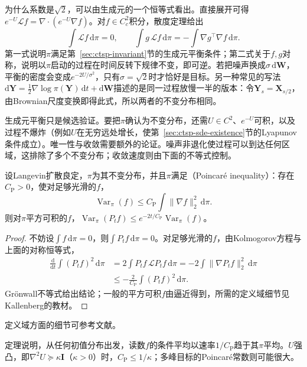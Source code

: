 为什么系数是$\sqrt2$，可以由生成元的一个恒等式看出。直接展开可得$e^{-U}\mathcal Lf=\nabla\cdot(e^{-U}\nabla f)$。对$f\in C^2_c$积分，散度定理给出
\[
  \int\mathcal Lf\,\mathrm d\pi=0,\qquad
  \int g\,\mathcal Lf\,\mathrm d\pi=-\int\nabla g^\top\nabla f\,\mathrm d\pi .
\]
第一式说明$\pi$满足第~\ref{sec:ctsp-invariant}节的生成元平衡条件；第二式关于$f,g$对称，说明以$\pi$启动的过程在时间反转下规律不变，即可逆。若把噪声换成$\sigma\,\mathrm d\bm W$，平衡的密度会变成$e^{-2U/\sigma^2}$，只有$\sigma=\sqrt2$时才恰好是目标。另一种常见的写法$\mathrm d\bm Y=\frac12\nabla\log\pi(\bm Y)\,\mathrm dt+\mathrm d\bm W$描述的是同一过程放慢一半的版本：令$\bm Y_s=\bm X_{s/2}$，由Brownian尺度变换即得此式，所以两者的不变分布相同。

生成元平衡只是候选验证。要把$\pi$确认为不变分布，还需$U\in C^2$、$e^{-U}$可积，以及过程不爆炸（例如$U$在无穷远处增长，使第~\ref{sec:ctsp-sde-existence}节的Lyapunov条件成立）。唯一性与收敛需要额外的论证。噪声非退化使过程可以到达任何区域，这排除了多个不变分布；收敛速度则由下面的不等式控制。

\begin{theorem}[Poincaré不等式与方差衰减]
  \label{thm:ctsp-poincare}
  设Langevin扩散良定，$\pi$为其不变分布，并且$\pi$满足（Poincaré inequality）：存在$C_{\mathrm P}>0$，使对足够光滑的$f$，
  \[
    \operatorname{Var}_\pi(f)\leq C_{\mathrm P}\int\|\nabla f\|_2^2\,\mathrm d\pi .
  \]
  则对$\pi$平方可积的$f$，$\operatorname{Var}_\pi(P_tf)\leq e^{-2t/C_{\mathrm P}}\operatorname{Var}_\pi(f)$。
\end{theorem}

\begin{proof}
不妨设$\int f\,\mathrm d\pi=0$，则$\int P_tf\,\mathrm d\pi=0$。对足够光滑的$f$，由Kolmogorov方程与上面的对称恒等式，
\[
  \begin{aligned}
    \frac{\mathrm d}{\mathrm dt}\int(P_tf)^2\,\mathrm d\pi&=2\int P_tf\,\mathcal LP_tf\,\mathrm d\pi=-2\int\|\nabla P_tf\|_2^2\,\mathrm d\pi\\
    &\leq-\frac2{C_{\mathrm P}}\int(P_tf)^2\,\mathrm d\pi .
  \end{aligned}
\]
Grönwall不等式给出结论；一般的平方可积$f$由逼近得到，所需的定义域细节见Kallenberg的教材。
\end{proof}

定义域方面的细节可参考文献。

定理说明，从任何初值分布出发，读数$f$的条件平均以速率$1/C_{\mathrm P}$趋于其$\pi$平均。$U$强凸，即$\nabla^2U\succeq\kappa\bm I$（$\kappa>0$）时，$C_{\mathrm P}\leq1/\kappa$；多峰目标的Poincaré常数则可能很大。

